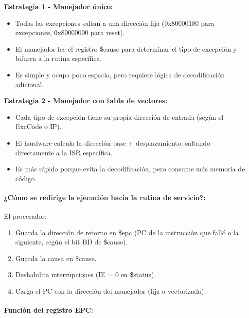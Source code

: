 \documentclass[12pt]{article}
\begin{document}
\textbf{Estrategia 1 - Manejador único:}

\begin{itemize}
    \item Todas las excepciones saltan a una dirección fija (0x80000180 para excepciones, 0x80000000 para reset).
    \item El manejador lee el registro \$cause para determinar el tipo de excepción y bifurca a la rutina específica.
    \item Es simple y ocupa poco espacio, pero requiere lógica de decodificación adicional.
\end{itemize}

\textbf{Estrategia 2 - Manejador con tabla de vectores:}

\begin{itemize}
    \item Cada tipo de excepción tiene su propia dirección de entrada (según el ExcCode o IP).
    \item El hardware calcula la dirección base + desplazamiento, saltando directamente a la ISR específica.
    \item Es más rápido porque evita la decodificación, pero consume más memoria de código.
\end{itemize}

\vspace{0.3cm}

\paragraph*{¿Cómo se redirige la ejecución hacia la rutina de servicio?:}

\vspace{0.2cm}

El procesador:

\begin{enumerate}
    \item Guarda la dirección de retorno en \$epc (PC de la instrucción que falló o la siguiente, según el bit BD de \$cause).
    \item Guarda la causa en \$cause.
    \item Deshabilita interrupciones (IE = 0 en \$status).
    \item Carga el PC con la dirección del manejador (fija o vectorizada).
\end{enumerate}

\paragraph*{Función del registro EPC:}
\end{document}
